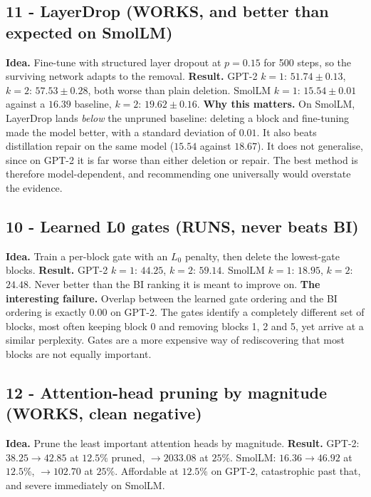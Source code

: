 \documentclass[11pt]{article}
\begin{document}
\subsection{11 - LayerDrop (WORKS, and better than expected on SmolLM)}
\textbf{Idea.} Fine-tune with structured layer dropout at $p=0.15$ for 500
steps, so the surviving network adapts to the removal.
\textbf{Result.} GPT-2 $k{=}1$: $51.74\pm0.13$, $k{=}2$: $57.53\pm0.28$,
both worse than plain deletion. SmolLM $k{=}1$: $\mathbf{15.54\pm0.01}$
against a $16.39$ baseline, $k{=}2$: $19.62\pm0.16$.
\textbf{Why this matters.} On SmolLM, LayerDrop lands \emph{below} the
unpruned baseline: deleting a block and fine-tuning made the model better,
with a standard deviation of $0.01$. It also beats distillation repair on the
same model ($15.54$ against $18.67$). It does not generalise, since on GPT-2
it is far worse than either deletion or repair. The best method is therefore
model-dependent, and recommending one universally would overstate the
evidence.

\subsection{10 - Learned L0 gates (RUNS, never beats BI)}
\textbf{Idea.} Train a per-block gate with an $L_0$ penalty, then delete the
lowest-gate blocks.
\textbf{Result.} GPT-2 $k{=}1$: $44.25$, $k{=}2$: $59.14$. SmolLM $k{=}1$:
$18.95$, $k{=}2$: $24.48$. Never better than the BI ranking it is meant to
improve on.
\textbf{The interesting failure.} Overlap between the learned gate ordering
and the BI ordering is exactly $0.00$ on GPT-2. The gates identify a
completely different set of blocks, most often keeping block 0 and removing
blocks 1, 2 and 5, yet arrive at a similar perplexity. Gates are a more
expensive way of rediscovering that most blocks are not equally important.

\subsection{12 - Attention-head pruning by magnitude (WORKS, clean negative)}
\textbf{Idea.} Prune the least important attention heads by magnitude.
\textbf{Result.} GPT-2: $38.25\rightarrow42.85$ at $12.5\%$ pruned,
$\rightarrow2033.08$ at $25\%$. SmolLM: $16.36\rightarrow46.92$ at $12.5\%$,
$\rightarrow102.70$ at $25\%$. Affordable at $12.5\%$ on GPT-2, catastrophic
past that, and severe immediately on SmolLM.
\end{document}
